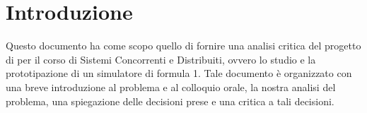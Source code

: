 \section{Introduzione}
Questo documento ha come scopo quello di fornire una analisi critica del progetto di per il corso di Sistemi Concorrenti e Distribuiti, ovvero lo studio e la prototipazione di un simulatore di formula 1. Tale documento è organizzato con una breve introduzione al problema e al colloquio orale, la nostra analisi del problema, una spiegazione delle decisioni prese e una critica a tali decisioni.